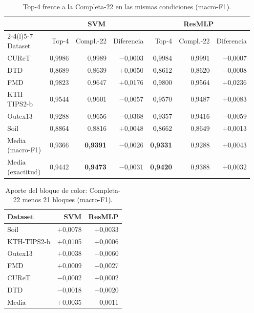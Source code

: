 \documentclass[11pt,a4paper]{article}
\newcommand{\pos}[1]{\textcolor{bien}{$+$#1}}
\newcommand{\negv}[1]{\textcolor{mal}{$-$#1}}
\begin{document}
\begin{table}[H]
\centering
\caption{Top-4 frente a la Completa-22 en las mismas condiciones (macro-F1).}
\small
\begin{tabular}{@{}lrrrrrr@{}}
\toprule
 & \multicolumn{3}{c}{SVM} & \multicolumn{3}{c}{ResMLP} \\
\cmidrule(lr){2-4}\cmidrule(l){5-7}
Dataset & Top-4 & Compl.-22 & Diferencia & Top-4 & Compl.-22 & Diferencia \\
\midrule
CUReT & 0,9986 & 0,9989 & \negv{0,0003} & 0,9984 & 0,9991 & \negv{0,0007} \\
DTD & 0,8689 & 0,8639 & \pos{0,0050} & 0,8612 & 0,8620 & \negv{0,0008} \\
FMD & 0,9823 & 0,9647 & \pos{0,0176} & 0,9800 & 0,9564 & \pos{0,0236} \\
KTH-TIPS2-b & 0,9544 & 0,9601 & \negv{0,0057} & 0,9570 & 0,9487 & \pos{0,0083} \\
Outex13 & 0,9288 & 0,9656 & \negv{0,0368} & 0,9357 & 0,9416 & \negv{0,0059} \\
Soil & 0,8864 & 0,8816 & \pos{0,0048} & 0,8662 & 0,8649 & \pos{0,0013} \\
\midrule
Media (macro-F1) & 0,9366 & \textbf{0,9391} & \negv{0,0026} & \textbf{0,9331} & 0,9288 & \pos{0,0043} \\
Media (exactitud) & 0,9442 & \textbf{0,9473} & \negv{0,0031} & \textbf{0,9420} & 0,9388 & \pos{0,0032} \\
\bottomrule
\end{tabular}
\end{table}

\begin{table}[H]
\centering
\caption{Aporte del bloque de color: Completa-22 menos 21 bloques (macro-F1).}
\begin{tabular}{@{}lrr@{}}
\toprule
Dataset & SVM & ResMLP \\
\midrule
Soil & \pos{0,0078} & \pos{0,0033} \\
KTH-TIPS2-b & \pos{0,0105} & \pos{0,0006} \\
Outex13 & \pos{0,0038} & \negv{0,0060} \\
FMD & \pos{0,0009} & \negv{0,0027} \\
CUReT & \negv{0,0002} & \pos{0,0002} \\
DTD & \negv{0,0018} & \negv{0,0020} \\
\midrule
Media & \pos{0,0035} & \negv{0,0011} \\
\bottomrule
\end{tabular}
\end{table}
\end{document}

